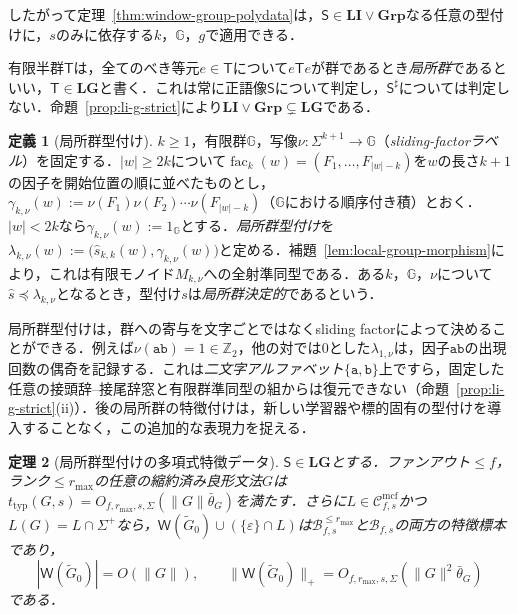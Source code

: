 \documentclass[11pt,a4paper]{ltjsarticle}
\numberwithin{equation}{section}
\theoremstyle{plain}
\newtheorem{theorem}{定理}[section]
\theoremstyle{definition}
\newtheorem{definition}[theorem]{定義}
\theoremstyle{remark}
\newcommand{\Wit}{\mathsf{W}}
\newcommand{\Cmcf}[2]{\mathcal{C}^{\mathrm{mcf}}_{#1,#2}}
\newcommand{\eps}{\varepsilon}
\begin{document}
したがって定理~\ref{thm:window-group-polydata}は，$\mathsf S\in\mathbf{LI}\vee\mathbf{Grp}$なる任意の型付けに，$s$のみに依存する$k$，${\mathbb G}$，$g$で適用できる．

有限半群$\mathsf T$は，全てのべき等元$e\in\mathsf T$について$e\mathsf Te$が群であるとき\emph{局所群}であるといい，$\mathsf T\in\mathbf{LG}$と書く．これは常に正語像$\mathsf S$について判定し，$\mathsf S^\sharp$については判定しない．命題~\ref{prop:li-g-strict}により$\mathbf{LI}\vee\mathbf{Grp}\subsetneq\mathbf{LG}$である．

\begin{definition}[局所群型付け]
\label{def:local-group-typing}
$k\ge1$，有限群${\mathbb G}$，写像$\nu:\Sigma^{k+1}\to {\mathbb G}$（\emph{sliding-factorラベル}）を固定する．$|w|\ge2k$について$\operatorname{fac}_k(w)=(F_1,\ldots,F_{|w|-k})$を$w$の長さ$k+1$の因子を開始位置の順に並べたものとし，$\gamma_{k,\nu}(w):=\nu(F_1)\nu(F_2)\cdots\nu(F_{|w|-k})$（${\mathbb G}$における順序付き積）とおく．$|w|<2k$なら$\gamma_{k,\nu}(w):=1_{\mathbb G}$とする．\emph{局所群型付け}を$\lambda_{k,\nu}(w):=\bigl(\widehat s_{k,k}(w),\gamma_{k,\nu}(w)\bigr)$と定める．補題~\ref{lem:local-group-morphism}により，これは有限モノイド$M_{k,\nu}$への全射準同型である．ある$k$，${\mathbb G}$，$\nu$について$\widehat s\preceq\lambda_{k,\nu}$となるとき，型付け$s$は\emph{局所群決定的}であるという．
\end{definition}

局所群型付けは，群への寄与を文字ごとではなくsliding factorによって決めることができる．例えば$\nu(\mathtt{ab})=1\in\mathbb Z_2$，他の対では$0$とした$\lambda_{1,\nu}$は，因子$\mathtt{ab}$の出現回数の偶奇を記録する．これは\emph{二文字アルファベット}$\{\mathtt a,\mathtt b\}$上ですら，固定した任意の接頭辞--接尾辞窓と有限群準同型の組からは復元できない（命題~\ref{prop:li-g-strict}(ii)）．後の局所群の特徴付けは，新しい学習器や標的固有の型付けを導入することなく，この追加的な表現力を捉える．

\begin{theorem}[局所群型付けの多項式特徴データ]
\label{thm:local-group-polydata}
$\mathsf S\in\mathbf{LG}$とする．ファンアウト$\le f$，ランク$\le r_{\max}$の任意の縮約済み良形文法$G$は$t_{\mathrm{typ}}(G,s)=O_{f,r_{\max},s,\Sigma}(\|G\|\bar\theta_G)$を満たす．さらに$L\in\Cmcf{f}{s}$かつ$L(G)=L\cap\Sigma^+$なら，$\Wit(\widetilde G_0)\cup(\{\eps\}\cap L)$は$\mathcal B^{\le r_{\max}}_{f,s}$と$\mathcal B_{f,s}$の両方の特徴標本であり，
\[
 |\Wit(\widetilde G_0)|=O(\|G\|),\qquad
 \|\Wit(\widetilde G_0)\|_+=O_{f,r_{\max},s,\Sigma}(\|G\|^2\bar\theta_G)
\]
である．
\end{theorem}
\end{document}
